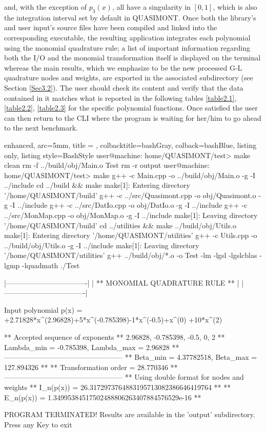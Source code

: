 \documentclass[a4paper, twosided]{book}
\begin{document}
\noindent
and, with the exception of $p_3(x)$, all have a singularity in $[0,1]$, which is also the integration interval set by default in QUASIMONT. Once both the library's and user input's source files have been compiled and linked into the corresponding executable, the resulting application integrates each polynomial using the monomial quadrature rule; a list of important information regarding both the I/O and the monomial transformation itself is displayed on the terminal whereas the main results, which we emphasize to be the new processed G-L quadrature nodes and weights, are exported in the associated subdirectory (see Section \ref{Sec3.2}). The user should check its content and verify that the data contained in it matches what is reported in the following tables \ref{table2.1}, \ref{table2.2}, \ref{table2.3} for the specific polynomial functions. Once satisfied the user can then return to the CLI where the program is waiting for her/him to go ahead to the next benchmark.

\vspace{0.5cm}
\begin{tcblisting}{enhanced,
                   arc=5mm,
                   title = \color{black}{\large \ttfamily Building and executing the test driver: p\_1(x)},
                   colbacktitle=bashGray,
                   colback=bashBlue,
                   listing only,
                   listing style=BashStyle}
user@machine: home/QUASIMONT/test> make clean
rm -f ../build/obj/Main.o Test
rm -r output
user@machine: home/QUASIMONT/test> make
g++ -c Main.cpp -o ../build/obj/Main.o -g  -I ../include
cd ../build && make
make[1]: Entering directory '/home/QUASIMONT/build'
g++ -c ../src/Quasimont.cpp -o obj/Quasimont.o -g -I ../include 
g++ -c ../src/DatIo.cpp -o obj/DatIo.o -g -I ../include 
g++ -c ../src/MonMap.cpp -o obj/MonMap.o -g -I ../include 
make[1]: Leaving directory '/home/QUASIMONT/build'
cd ../utilities && make ../build/obj/Utils.o
make[1]: Entering directory '/home/QUASIMONT/utilities'
g++ -c Utils.cpp -o ../build/obj/Utils.o -g -I ../include
make[1]: Leaving directory '/home/QUASIMONT/utilities'
g++ ../build/obj/*.o -o Test -lm -lgsl -lgslcblas -lgmp -lquadmath
./Test

    |----------------------------------|
    |  ** MONOMIAL QUADRATURE RULE **  |
    |----------------------------------|


 Input polynomial p(x) = +2.71828*x^(2.96828)+5*x^(-0.785398)-1*x^(-0.5)+x^(0) +10*x^(2)

 ** Accepted sequence of exponents ** 
    {2.96828, -0.785398, -0.5, 0, 2}
 ** Lambda_min = -0.785398, Lambda_max = 2.96828 **
 --------------------------------------------------
 ** Beta_min = 4.37782518, Beta_max = 127.894326 **
 ** Transformation order = 28.770346 **
 --------------------------------------------------
 ** Using double format for nodes and weights
 ** I_n(p(x)) = 26.3172973764883195713082386646419764 **
 ** E_n(p(x)) = 1.34995384517502488806263407884576529e-16 **


PROGRAM TERMINATED! Results are available in the 'output' subdirectory.
Press any Key to exit
\end{tcblisting}
\vspace{0.5cm}
\end{document}
